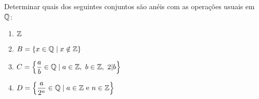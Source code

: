 \documentclass[12pt]{article}
\begin{document}
\vesp

\questao Determinar quais dos seguintes conjuntos são an{\'e}is com as operações usuais em $\mathbb{Q}$:
	\begin{multicols}{2}
		\begin{enumerate}[label=({\alph*})]
			\item $\mathbb{Z}$
			\item $B = \{x \in \mathbb{Q} \mid x \notin \mathbb{Z}\}$
			\item $C = \left\{\dfrac{a}{b} \in \mathbb{Q} \mid a \in \mathbb{Z},\ b \in \mathbb{Z},\ 2 |b \right\}$
			\item $D = \left\{\dfrac{a}{2^n} \in \mathbb{Q} \mid a \in \mathbb{Z} \mbox{ e } n \in \mathbb{Z} \right\}$
		\end{enumerate}
	\end{multicols}

\vesp
\end{document}
